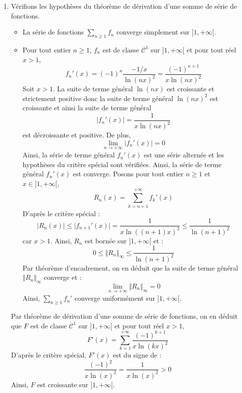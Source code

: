 \documentclass[a4paper,10pt]{report}
\newcommand{\Sum}[2]{\ensuremath{\textstyle{\sum\limits_{#1}^{#2}}}}
\begin{document}
\begin{enumerate}
\medskip

\noindent $\rhd$ Pour tout $x \in ]1, + \infty[$,
$$ F(x) = - \dfrac{1}{\ln(x)} + \sum_{n=2}^{+ \infty} f_n(x)$$
La série $\Sum{n\geq 2}{} f_n$ converge uniformément sur $]1, + \infty[$ donc $1$ est une extrémité. Pour tout $n \geq 2$,
$$ \lim_{x \rightarrow 1} f_n(x) = \dfrac{(-1)^n}{\ln(n)}$$
Par théorème d'interversion limite-somme, on en déduit que la somme de $\Sum{n\geq 2}{} f_n$ admet une limite finie en $1^+$ valant :
$$ \sum_{n=2}^{+ \infty} \dfrac{(-1)^n}{\ln(n)}$$
Ainsi, $x \mapsto F(x) + \dfrac{1}{\ln(x)}$ admet une limite finie quand $x$ tend vers $1^+$. Or :
$$ \lim_{x \rightarrow 1^+} \dfrac{1}{\ln(x)} = + \infty$$
On en déduit que $F$ admet pour limite $- \infty$ en $1^{+}$ (par somme d'une fonction ayant cette limite et d'une fonction admettant une limite finie).
\item Vérifions les hypothèses du théorème de dérivation d'une somme de série de fonctions.
\begin{itemize}
\item La série de fonctions $\Sum{n\geq 1}{} f_n$ converge simplement sur $]1, + \infty[$.
\item Pour tout entier $n \geq 1$, $f_n$ est de classe $\mathcal{C}^1$ sur $]1, + \infty[$ et pour tout réel $x>1$,
$$ f_n'(x) = (-1)^n \dfrac{-1/x}{\ln(nx)^2} = \dfrac{(-1)^{n+1}}{x \ln(nx)^2}$$
Soit $x>1$. La suite de terme général $\ln(nx)$ est croissante et strictement positive donc la suite de terme général $\ln(nx)^2$ est croissante et ainsi la suite de terme général 
$$ \vert f_n'(x) \vert = \dfrac{1}{x \ln(nx)^2}$$
est décroissante et positive. De plus,
$$ \lim_{n \rightarrow + \infty} \vert f_n'(x) \vert = 0$$
Ainsi, la série de terme général $f_n'(x)$ est une série alternée et les hypothèses du critère spécial sont vérifiées. Ainsi, la série de terme général $f_n'(x)$ est converge. Posons pour tout entier $n \geq 1$ et $x \in ]1, + \infty[$,
$$ R_n(x) = \sum_{k=n+1}^{+ \infty} f_k'(x)$$
D'après le critère spécial :
$$ \vert R_n(x) \vert \leq \vert f_{n+1}'(x) \vert = \dfrac{1}{x \ln((n+1)x)^2} \leq \dfrac{1}{\ln(n+1)^2}$$
car $x>1$. Ainsi, $R_n$ est bornée sur $]1, + \infty[$ et :
$$ 0 \leq \Vert R_n \Vert_{\infty} \leq \dfrac{1}{\ln(n+1)^2}$$
Par théorème d'encadrement, on en déduit que la suite de terme général $\Vert R_n \Vert_{\infty}$ converge et :
$$ \lim_{n \rightarrow + \infty} \Vert R_n \Vert_{\infty} = 0$$
Ainsi, $\Sum{n\geq 1}{} f_n'$ converge uniformément sur $]1, + \infty[$.
\end{itemize}
Par théorème de dérivation d'une somme de série de fonctions, on en déduit que $F$ est de classe $\mathcal{C}^1$ sur $]1, + \infty[$ et pour tout réel $x>1$,
$$ F'(x) = \sum_{k=1}^{+ \infty} \dfrac{(-1)^{k+1}}{x \ln(kx)^2}$$
D'après le critère spécial, $F'(x)$ est du signe de :
$$ \dfrac{(-1)^{2}}{x \ln(x)^2} = \dfrac{1}{x \ln(x)^2}>0$$
Ainsi, $F$ est croissante sur $]1, + \infty[$.


\end{enumerate}
\end{document}
